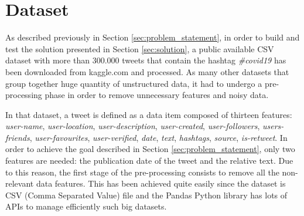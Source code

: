 \section{Dataset}
\label{sec:dataset}
As described previously in Section \ref{sec:problem_statement}, in order to build and test the solution presented in Section \ref{sec:solution}, a public available CSV dataset with more than 300.000 tweets that contain the hashtag \textit{\#covid19} \cite{covid19-tweets-dataset} has been downloaded from kaggle.com and processed. As many other datasets that group together huge quantity of unstructured data, it had to undergo a pre-processing phase in order to remove unnecessary features and noisy data. 

In that dataset, a tweet is defined as a data item composed of thirteen features: \textit{user-name}, \textit{user-location}, \textit{user-description}, \textit{user-created}, \textit{user-followers}, \textit{users-friends}, \textit{user-favourites}, \textit{user-verified}, \textit{date}, \textit{text}, \textit{hashtags}, \textit{source}, \textit{is-retweet}. In order to achieve the goal described in Section \ref{sec:problem_statement}, only two features are needed: the publication date of the tweet and the relative text. Due to this reason, the first stage of the pre-processing consists to remove all the non-relevant data features. This has been achieved quite easily since the dataset is CSV (Comma Separated Value) file and the Pandas Python library \cite{python-pandas} has lots of APIs to manage efficiently such big datasets.

